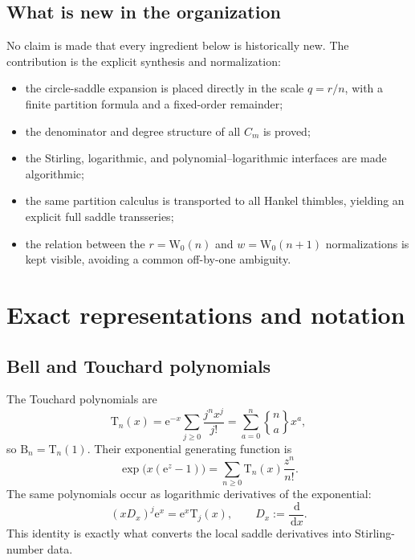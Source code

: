 \documentclass[11pt,a4paper]{article}
\theoremstyle{definition}
\newcommand{\Bell}{\mathrm B}
\newcommand{\Touch}{\mathrm T}
\newcommand{\W}{\mathrm W}
\newcommand{\ee}{\mathrm e}
\newcommand{\dd}{\,\mathrm d}
\newcommand{\Stwo}[2]{\genfrac{\{}{\}}{0pt}{}{#1}{#2}}
\begin{document}
\subsection{What is new in the organization}

No claim is made that every ingredient below is historically new.  The
contribution is the explicit synthesis and normalization:
\begin{itemize}
 \item the circle-saddle expansion is placed directly in the scale
       $q=r/n$, with a finite partition formula and a fixed-order remainder;
 \item the denominator and degree structure of all $C_m$ is proved;
 \item the Stirling, logarithmic, and polynomial--logarithmic interfaces are
       made algorithmic;
 \item the same partition calculus is transported to all Hankel thimbles,
       yielding an explicit full saddle transseries;
 \item the relation between the $r=\W_0(n)$ and $w=\W_0(n+1)$ normalizations is
       kept visible, avoiding a common off-by-one ambiguity.
\end{itemize}

\section{Exact representations and notation}

\subsection{Bell and Touchard polynomials}

The Touchard polynomials are
\begin{equation}\label{eq:touchard}
 \Touch_n(x)=\ee^{-x}\sum_{j\ge0}\frac{j^n x^j}{j!}
 =\sum_{a=0}^n \Stwo{n}{a}x^a,
\end{equation}
so $\Bell_n=\Touch_n(1)$.  Their exponential generating function is
\begin{equation}\label{eq:touchard-egf}
 \exp\!\bigl(x(\ee^z-1)\bigr)
 =\sum_{n\ge0}\Touch_n(x)\frac{z^n}{n!}.
\end{equation}
The same polynomials occur as logarithmic derivatives of the exponential:
\begin{equation}\label{eq:derivative-touchard}
 (xD_x)^j\ee^x=\ee^x\Touch_j(x),
 \qquad D_x:=\frac{\dd}{\dd x}.
\end{equation}
This identity is exactly what converts the local saddle derivatives into
Stirling-number data.
\end{document}
